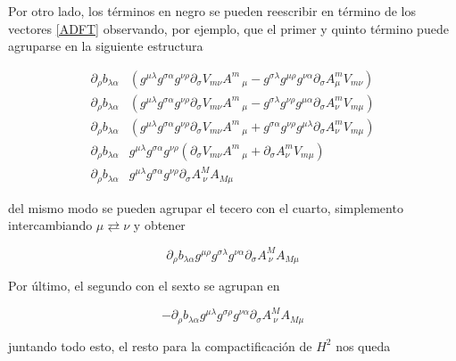 \documentclass{article}
\numberwithin{equation}{section}
\begin{document}
Por otro lado, los términos en negro se pueden reescribir en término de los vectores \ref{ADFT} observando, por ejemplo, que el primer y quinto término puede agruparse en la siguiente estructura

\begin{equation}
\begin{aligned}
\partial_{\rho}{b_{\lambda \alpha}}& \left( g^{\mu \lambda} g^{\sigma \alpha} g^{\nu \rho}  \partial_{\sigma}{V_{m \nu}} A^{m}\,_{\mu}  - g^{\sigma \lambda} g^{\mu \rho} g^{\nu \alpha} \partial_{\sigma}{A^{m}_{\mu}} V_{m \nu} \right)\\
\partial_{\rho}{b_{\lambda \alpha}}& \left( g^{\mu \lambda} g^{\sigma \alpha} g^{\nu \rho}  \partial_{\sigma}{V_{m \nu}} A^{m}\,_{\mu}  - g^{\sigma \lambda} g^{\nu \rho} g^{\mu \alpha} \partial_{\sigma}{A^{m}_{\nu}} V_{m \mu} \right)\\
\partial_{\rho}{b_{\lambda \alpha}}& \left( g^{\mu \lambda} g^{\sigma \alpha} g^{\nu \rho}  \partial_{\sigma}{V_{m \nu}} A^{m}\,_{\mu}  + g^{\sigma \alpha} g^{\nu \rho} g^{\mu \lambda} \partial_{\sigma}{A^{m}_{\nu}} V_{m \mu} \right)\\
\partial_{\rho}{b_{\lambda \alpha}}& g^{\mu \lambda} g^{\sigma \alpha} g^{\nu \rho} \left(   \partial_{\sigma}{V_{m \nu}} A^{m}\,_{\mu}  + \partial_{\sigma}{A^{m}_{\nu}} V_{m \mu} \right)\\
\partial_{\rho}{b_{\lambda \alpha}}& g^{\mu \lambda} g^{\sigma \alpha} g^{\nu \rho} \partial_{\sigma}{A^M_{\ \nu}} A_{M \mu}
\end{aligned}
\end{equation}

del mismo modo se pueden agrupar el tecero con el cuarto, simplemento intercambiando $ \mu \rightleftarrows \nu $ y obtener

\begin{equation}
\partial_{\rho}{b_{\lambda \alpha}} g^{\mu \rho} g^{\sigma \lambda} g^{\nu \alpha} \partial_{\sigma}{A^M_{\ \nu}} A_{M \mu}
\end{equation}

Por último, el segundo con el sexto se agrupan en

\begin{equation}
- \partial_{\rho}{b_{\lambda \alpha}} g^{\mu \lambda} g^{\sigma \rho} g^{\nu \alpha} \partial_{\sigma}{A^M_{\ \nu}} A_{M \mu}
\end{equation}

juntando todo esto, el resto para la compactificación de $ H^2 $ nos queda
\end{document}
